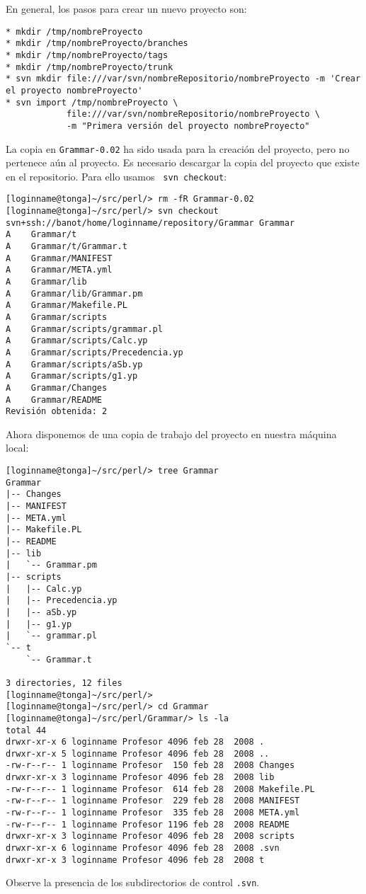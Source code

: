 En general, los pasos para crear un nuevo proyecto son:

\begin{verbatim}
* mkdir /tmp/nombreProyecto
* mkdir /tmp/nombreProyecto/branches
* mkdir /tmp/nombreProyecto/tags
* mkdir /tmp/nombreProyecto/trunk
* svn mkdir file:///var/svn/nombreRepositorio/nombreProyecto -m 'Crear el proyecto nombreProyecto'
* svn import /tmp/nombreProyecto \
            file:///var/svn/nombreRepositorio/nombreProyecto \
            -m "Primera versión del proyecto nombreProyecto"
\end{verbatim}



La copia en \verb|Grammar-0.02| ha sido usada para la creación del proyecto, 
pero no pertenece aún al proyecto. Es necesario descargar la copia del
proyecto que existe en el repositorio. Para ello usamos
\verb| svn checkout|:
\begin{verbatim}
[loginname@tonga]~/src/perl/> rm -fR Grammar-0.02
[loginname@tonga]~/src/perl/> svn checkout svn+ssh://banot/home/loginname/repository/Grammar Grammar
A    Grammar/t
A    Grammar/t/Grammar.t
A    Grammar/MANIFEST
A    Grammar/META.yml
A    Grammar/lib
A    Grammar/lib/Grammar.pm
A    Grammar/Makefile.PL
A    Grammar/scripts
A    Grammar/scripts/grammar.pl
A    Grammar/scripts/Calc.yp
A    Grammar/scripts/Precedencia.yp
A    Grammar/scripts/aSb.yp
A    Grammar/scripts/g1.yp
A    Grammar/Changes
A    Grammar/README
Revisión obtenida: 2
\end{verbatim}
Ahora disponemos de una copia de trabajo del proyecto en
nuestra máquina local:
\begin{verbatim}
[loginname@tonga]~/src/perl/> tree Grammar
Grammar
|-- Changes
|-- MANIFEST
|-- META.yml
|-- Makefile.PL
|-- README
|-- lib
|   `-- Grammar.pm
|-- scripts
|   |-- Calc.yp
|   |-- Precedencia.yp
|   |-- aSb.yp
|   |-- g1.yp
|   `-- grammar.pl
`-- t
    `-- Grammar.t

3 directories, 12 files
[loginname@tonga]~/src/perl/>       
[loginname@tonga]~/src/perl/> cd Grammar
[loginname@tonga]~/src/perl/Grammar/> ls -la
total 44
drwxr-xr-x 6 loginname Profesor 4096 feb 28  2008 .
drwxr-xr-x 5 loginname Profesor 4096 feb 28  2008 ..
-rw-r--r-- 1 loginname Profesor  150 feb 28  2008 Changes
drwxr-xr-x 3 loginname Profesor 4096 feb 28  2008 lib
-rw-r--r-- 1 loginname Profesor  614 feb 28  2008 Makefile.PL
-rw-r--r-- 1 loginname Profesor  229 feb 28  2008 MANIFEST
-rw-r--r-- 1 loginname Profesor  335 feb 28  2008 META.yml
-rw-r--r-- 1 loginname Profesor 1196 feb 28  2008 README
drwxr-xr-x 3 loginname Profesor 4096 feb 28  2008 scripts
drwxr-xr-x 6 loginname Profesor 4096 feb 28  2008 .svn
drwxr-xr-x 3 loginname Profesor 4096 feb 28  2008 t
\end{verbatim}
Observe la presencia de los subdirectorios de control \verb|.svn|.

